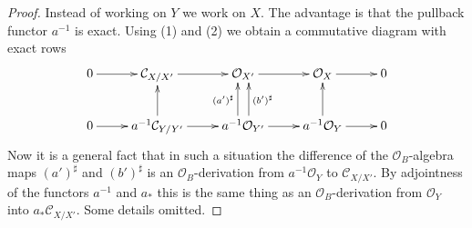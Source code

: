 \documentclass[10pt,a4paper]{amsart}
\theoremstyle{plain}
\theoremstyle{definition}
\theoremstyle{remark}
\numberwithin{equation}{subsection}
\begin{document}
\begin{proof}
Instead of working on $Y$ we work on $X$. The advantage is that the pullback
functor $a^{-1}$ is exact. Using (1) and (2) we obtain a commutative diagram
with exact rows
$$
\xymatrix{
0 \ar[r] &
\mathcal{C}_{X/X'} \ar[r] &
\mathcal{O}_{X'} \ar[r] &
\mathcal{O}_X \ar[r] & 0 \\
0 \ar[r] &
a^{-1}\mathcal{C}_{Y/Y'} \ar[r] \ar[u] &
a^{-1}\mathcal{O}_{Y'}
\ar[r] \ar@<1ex>[u]^{(a')^\sharp} \ar@<-1ex>[u]_{(b')^\sharp} &
a^{-1}\mathcal{O}_Y \ar[r] \ar[u] & 0
}
$$
Now it is a general fact that in such a situation the difference of the
$\mathcal{O}_B$-algebra maps $(a')^\sharp$ and $(b')^\sharp$ is an
$\mathcal{O}_B$-derivation from $a^{-1}\mathcal{O}_Y$ to $\mathcal{C}_{X/X'}$.
By adjointness of the functors $a^{-1}$ and $a_*$ this is the same
thing as an $\mathcal{O}_B$-derivation from
$\mathcal{O}_Y$ into $a_*\mathcal{C}_{X/X'}$. Some details omitted.
\end{proof}
\end{document}
